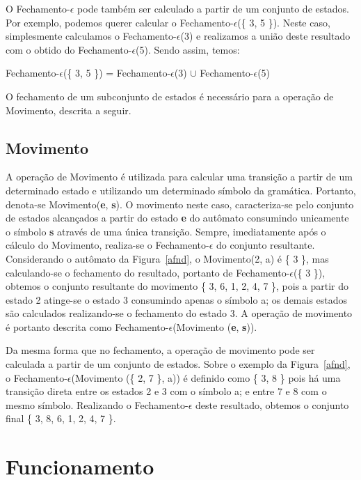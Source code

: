 \documentclass{compiladores}
\newcommand{\vazio}{{\LARGE$\epsilon$}\xspace}
\begin{document}
O Fechamento-\vazio pode também ser calculado a partir de um conjunto
de estados. Por exemplo, podemos querer calcular o
Fechamento-\vazio(\{ 3, 5 \}). Neste caso, simplesmente calculamos o
Fechamento-\vazio(3) e realizamos a união deste resultado com o obtido
do Fechamento-\vazio(5). Sendo assim, temos:

\begin{center}
Fechamento-\vazio(\{ 3, 5 \}) = Fechamento-\vazio(3) $\cup$ Fechamento-\vazio(5)
\end{center}

O fechamento de um subconjunto de estados é necessário para a operação de
Movimento, descrita a seguir.

\subsection{Movimento}

A operação de Movimento é utilizada para calcular uma transição a
partir de um determinado estado e utilizando um determinado símbolo da
gramática. Portanto, denota-se Movimento({\bf e}, {\bf s}). O
movimento neste caso, caracteriza-se pelo conjunto de estados
alcançados a partir do estado {\bf e} do autômato consumindo
unicamente o símbolo {\bf s} através de uma única transição. Sempre,
imediatamente após o cálculo do Movimento, realiza-se o
Fechamento-\vazio do conjunto resultante.  Considerando o autômato da
Figura~\ref{afnd}, o Movimento(2, a) é \{ 3 \}, mas calculando-se o
fechamento do resultado, portanto de Fechamento-\vazio(\{ 3 \}),
obtemos o conjunto resultante do movimento \{ 3, 6, 1, 2, 4, 7 \},
pois a partir do estado 2 atinge-se o estado 3 consumindo apenas o
símbolo a; os demais estados são calculados realizando-se o fechamento
do estado 3. A operação de movimento é portanto descrita como
Fechamento-\vazio(Movimento ({\bf e}, {\bf s})).

Da mesma forma que no fechamento, a operação de movimento pode ser
calculada a partir de um conjunto de estados. Sobre o exemplo da
Figura~\ref{afnd}, o Fechamento-\vazio (Movimento (\{ 2, 7 \}, a)) é
definido como \{ 3, 8 \} pois há uma transição direta entre os estados
2 e 3 com o símbolo a; e entre 7 e 8 com o mesmo símbolo. Realizando o
Fechamento-\vazio deste resultado, obtemos o conjunto final \{ 3, 8,
6, 1, 2, 4, 7 \}.

\section{Funcionamento}
\end{document}
